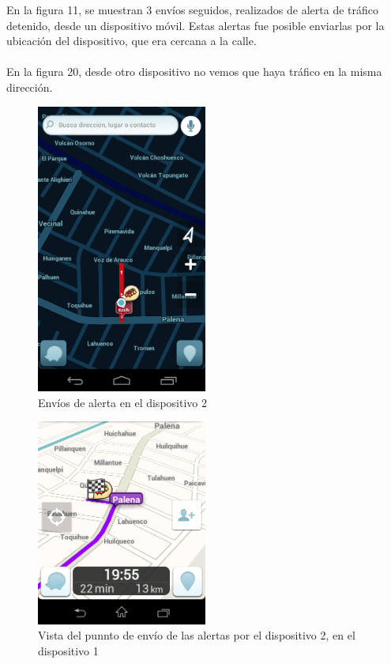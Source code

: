 En la figura 11, se muestran 3 envíos seguidos, realizados de alerta de tráfico detenido, desde un dispositivo móvil. Estas alertas fue posible enviarlas por la ubicación del dispositivo, que era cercana a la calle.
\\\\
En la figura 20, desde otro dispositivo no vemos que haya tráfico en la misma dirección.


        \begin{figure}[H]
  \begin{center}
    \includegraphics[width=0.5\textwidth]{imagenes/fig22.png}
    \caption{Envíos de alerta en el dispositivo 2}
  \end{center}
\end{figure}


        \begin{figure}[H]
  \begin{center}
    \includegraphics[width=0.5\textwidth]{imagenes/fig23.png}
    \caption{Vista del punnto de envío de las alertas por el dispositivo 2, en el                   dispositivo 1}
  \end{center}
\end{figure}


